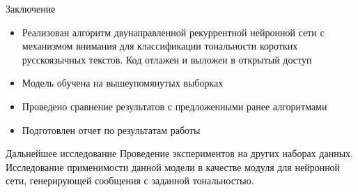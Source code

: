 \documentclass{beamer}
\begin{document}
\begin{frame}{Заключение}

	\begin{itemize}
		\item Реализован алгоритм двунаправленной рекуррентной нейронной сети с механизмом внимания для классификации тональности коротких русскоязычных текстов. Код отлажен и выложен в открытый доступ
		\item Модель обучена на вышеупомянутых выборках
		\item Проведено сравнение результатов с предложенными ранее алгоритмами
		\item Подготовлен отчет по результатам работы
	\end{itemize}

	\begin{block}{Дальнейшее исследование}
		Проведение экспериментов на других наборах данных.\\
		Исследование применимости данной модели в качестве модуля для нейронной сети, генерирующей сообщения с заданной тональностью.
	\end{block}
\end{frame}
\end{document}

